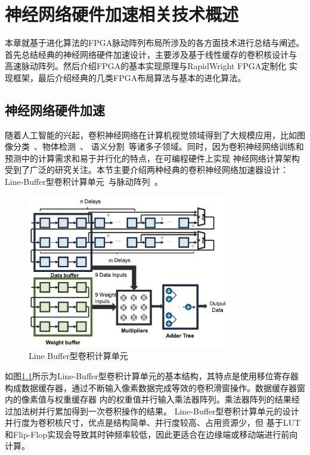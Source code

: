 \chapter{神经网络硬件加速相关技术概述}


本章就基于进化算法的FPGA脉动阵列布局所涉及的各方面技术进行总结与阐述。
首先总结经典的神经网络硬件加速设计，主要涉及基于线性缓存的卷积核设计与
高速脉动阵列。然后介绍FPGA的基本实现原理与RapidWright FPGA定制化
实现框架，最后介绍经典的几类FPGA布局算法与基本的进化算法。

\section{神经网络硬件加速}

随着人工智能的兴起，卷积神经网络在计算机视觉领域得到了大规模应用，比如图像分类~\cite{szegedy2017inception}、物体检测~\cite{redmon2018yolov3}、
语义分割~\cite{barkau1996unet}等诸多子领域。同时，因为卷积神经网络训练和预测中的计算需求和易于并行化的特点，在可编程硬件上实现
神经网络计算架构受到了广泛的研究关注。本节主要介绍两种经典的卷积神经网络加速器设计：
Line-Buffer型卷积计算单元~\cite{qiu2016going}与脉动阵列~\cite{nachiket_stc_fpl2019}。

\begin{figure}[h]
	\centering
	\includegraphics[width=0.8\textwidth]{figure/line-buffer}
	\caption{Line Buffer型卷积计算单元~\cite{qiu2016going}} 
	\label{fig:conv}
\end{figure}

如图\ref{fig:conv}所示为Line-Buffer型卷积计算单元的基本结构，其特点是使用移位寄存器
构成数据缓存器，通过不断输入像素数据完成等效的卷积滑窗操作。数据缓存器窗内的像素值与权重缓存器
内的权重值并行输入乘法器阵列。乘法器阵列的结果经过加法树并行累加得到一次卷积操作的结果。
Line-Buffer型卷积计算单元的设计并行度为卷积核尺寸，优点是结构简单、并行度较高、占用资源少，但
基于LUT和Flip-Flop实现会导致其时钟频率较低，因此更适合在边缘端或移动端进行前向计算。

